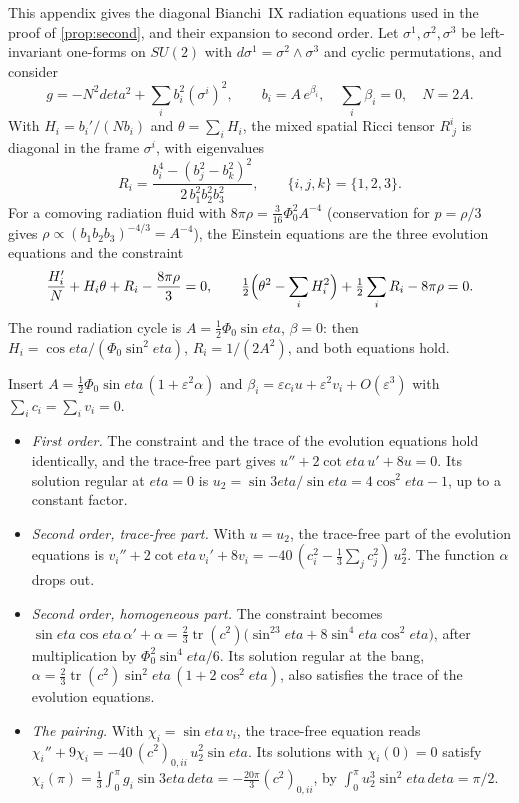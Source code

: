 \documentclass[11pt]{article}
\theoremstyle{canonmath}
\theoremstyle{canonpostulate}
\theoremstyle{canonproposition}
\theoremstyle{canonmath}
\theoremstyle{canonproposition}
\def\eta{eta}%
\begin{document}
This appendix gives the diagonal Bianchi~IX radiation equations used in the proof of \cref{prop:second}, and their expansion to second order. Let $\sigma^1,\sigma^2,\sigma^3$ be left-invariant one-forms on $SU(2)$ with $d\sigma^1 = \sigma^2\wedge\sigma^3$ and cyclic permutations, and consider
\[
g = -N^2d\eta^2 + \sum_ib_i^2(\sigma^i)^2, \qquad b_i = A\,e^{\beta_i}, \quad \sum_i\beta_i = 0, \quad N = 2A.
\]
With $H_i = b_i'/(Nb_i)$ and $\theta = \sum_iH_i$, the mixed spatial Ricci tensor $R^i_{\ j}$ is diagonal in the frame $\sigma^i$, with eigenvalues
\[
R_i = \frac{b_i^4 - (b_j^2-b_k^2)^2}{2\,b_1^2b_2^2b_3^2}, \qquad \{i,j,k\} = \{1,2,3\}.
\]
For a comoving radiation fluid with $8\pi\rho = \tfrac3{16}\Phi_0^2A^{-4}$ (conservation for $p = \rho/3$ gives $\rho\propto(b_1b_2b_3)^{-4/3} = A^{-4}$), the Einstein equations are the three evolution equations and the constraint
\[
\frac{H_i'}{N} + H_i\theta + R_i - \frac{8\pi\rho}{3} = 0, \qquad \tfrac12\Bigl(\theta^2 - \sum_iH_i^2\Bigr) + \tfrac12\sum_iR_i - 8\pi\rho = 0.
\]
The round radiation cycle is $A = \tfrac12\Phi_0\sin\eta$, $\beta = 0$: then $H_i = \cos\eta/(\Phi_0\sin^2\eta)$, $R_i = 1/(2A^2)$, and both equations hold.

Insert $A = \tfrac12\Phi_0\sin\eta\,(1+\varepsilon^2\alpha)$ and $\beta_i = \varepsilon c_iu + \varepsilon^2v_i + O(\varepsilon^3)$ with $\sum_ic_i = \sum_iv_i = 0$.
\begin{itemize}
\item \emph{First order.} The constraint and the trace of the evolution equations hold identically, and the trace-free part gives $u'' + 2\cot\eta\,u' + 8u = 0$. Its solution regular at $\eta = 0$ is $u_2 = \sin3\eta/\sin\eta = 4\cos^2\eta - 1$, up to a constant factor.
\item \emph{Second order, trace-free part.} With $u = u_2$, the trace-free part of the evolution equations is $v_i'' + 2\cot\eta\,v_i' + 8v_i = -40\,(c_i^2 - \tfrac13\textstyle\sum_jc_j^2)\,u_2^2$. The function $\alpha$ drops out.
\item \emph{Second order, homogeneous part.} The constraint becomes $\sin\eta\cos\eta\,\alpha' + \alpha = \tfrac23\operatorname{tr}(c^2)\bigl(\sin^23\eta + 8\sin^4\eta\cos^2\eta\bigr)$, after multiplication by $\Phi_0^2\sin^4\eta/6$. Its solution regular at the bang, $\alpha = \tfrac23\operatorname{tr}(c^2)\sin^2\eta\,(1+2\cos^2\eta)$, also satisfies the trace of the evolution equations.
\item \emph{The pairing.} With $\chi_i = \sin\eta\,v_i$, the trace-free equation reads $\chi_i'' + 9\chi_i = -40\,(c^2)_{0,ii}\,u_2^2\sin\eta$. Its solutions with $\chi_i(0) = 0$ satisfy $\chi_i(\pi) = \tfrac13\int_0^\pi g_i\sin3\eta\,d\eta = -\tfrac{20\pi}{3}(c^2)_{0,ii}$, by $\int_0^\pi u_2^3\sin^2\eta\,d\eta = \pi/2$.
\end{itemize}
\end{document}
